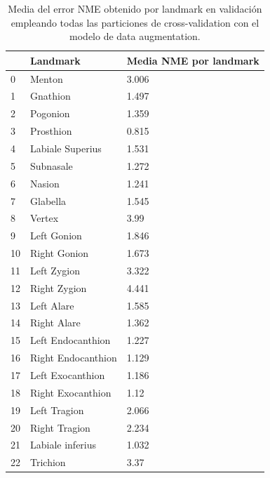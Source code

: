             \begin{table}[!ht]
                \centering
                \caption{Media del error NME obtenido por landmark en validación empleando todas las particiones de cross-validation con el modelo de data augmentation.}
                \begin{tabular}{|l|l|l|}
                \hline
                    ~ & Landmark & Media NME por landmark \\ \hline
                    0 & Menton & 3.006 \\ \hline
                    1 & Gnathion & 1.497 \\ \hline
                    2 & Pogonion & 1.359 \\ \hline
                    3 & Prosthion & 0.815 \\ \hline
                    4 & Labiale Superius & 1.531 \\ \hline
                    5 & Subnasale & 1.272 \\ \hline
                    6 & Nasion & 1.241 \\ \hline
                    7 & Glabella & 1.545 \\ \hline
                    8 & Vertex & 3.99 \\ \hline
                    9 & Left Gonion & 1.846 \\ \hline
                    10 & Right Gonion & 1.673 \\ \hline
                    11 & Left Zygion & 3.322 \\ \hline
                    12 & Right Zygion & 4.441 \\ \hline
                    13 & Left Alare & 1.585 \\ \hline
                    14 & Right Alare & 1.362 \\ \hline
                    15 & Left Endocanthion & 1.227 \\ \hline
                    16 & Right Endocanthion & 1.129 \\ \hline
                    17 & Left Exocanthion & 1.186 \\ \hline
                    18 & Right Exocanthion & 1.12 \\ \hline
                    19 & Left Tragion & 2.066 \\ \hline
                    20 & Right Tragion & 2.234 \\ \hline
                    21 & Labiale inferius & 1.032 \\ \hline
                    22 & Trichion & 3.37 \\ \hline

\end{tabular}
\end{table}
